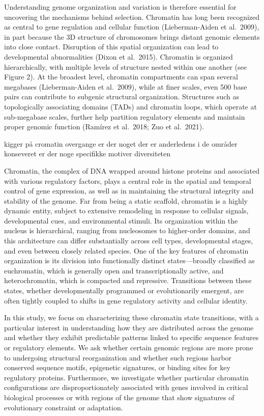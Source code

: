 \documentclass[
  a4paper,
  openany]{scrbook}
\begin{document}
Understanding genome organization and variation is therefore essential
for uncovering the mechanisms behind selection. Chromatin has long been
recognized as central to gene regulation and cellular function
(Lieberman-Aiden et al.~2009), in part because the 3D structure of
chromosomes brings distant genomic elements into close contact.
Disruption of this spatial organization can lead to developmental
abnormalities \cite{Dixon2015} (Dixon et al.~2015). Chromatin is
organized hierarchically, with multiple levels of structure nested
within one another (see Figure 2). At the broadest level, chromatin
compartments can span several megabases \cite{LiebermanAiden2009}
(Lieberman-Aiden et al.~2009), while at finer scales, even 500 base
pairs can contribute to subgenic structural organization. Structures
such as topologically associating domains (TADs) and chromatin loops,
which operate at sub-megabase scales, further help partition regulatory
elements and maintain proper genomic function
\cite{Ramirez2018}\cite{Zuo2021}(Ramírez et al.~2018; Zuo et al.~2021).

kigger på cromatin overgange er der noget der er anderledens i de
områder konseveret er der noge specifikke motiver diversiteten

Chromatin, the complex of DNA wrapped around histone proteins and
associated with various regulatory factors, plays a central role in the
spatial and temporal control of gene expression, as well as in
maintaining the structural integrity and stability of the genome. Far
from being a static scaffold, chromatin is a highly dynamic entity,
subject to extensive remodeling in response to cellular signals,
developmental cues, and environmental stimuli. Its organization within
the nucleus is hierarchical, ranging from nucleosomes to higher-order
domains, and this architecture can differ substantially across cell
types, developmental stages, and even between closely related species.
One of the key features of chromatin organization is its division into
functionally distinct states---broadly classified as euchromatin, which
is generally open and transcriptionally active, and heterochromatin,
which is compacted and repressive. Transitions between these states,
whether developmentally programmed or evolutionarily emergent, are often
tightly coupled to shifts in gene regulatory activity and cellular
identity.

In this study, we focus on characterizing these chromatin state
transitions, with a particular interest in understanding how they are
distributed across the genome and whether they exhibit predictable
patterns linked to specific sequence features or regulatory elements. We
ask whether certain genomic regions are more prone to undergoing
structural reorganization and whether such regions harbor conserved
sequence motifs, epigenetic signatures, or binding sites for key
regulatory proteins. Furthermore, we investigate whether particular
chromatin configurations are disproportionately associated with genes
involved in critical biological processes or with regions of the genome
that show signatures of evolutionary constraint or adaptation.
\end{document}
